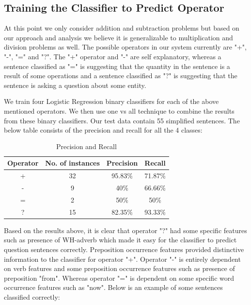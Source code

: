 \documentclass[11pt]{article}
\begin{document}
\subsection{Training the Classifier to Predict Operator}
At this point we only consider addition and subtraction problems but based on our approach and analysis we believe it is generalizable to multiplication and division problems as well. The possible operators in our system currently are "+", "-", "=" and "?". The "+" operator and "-" are self explanatory, whereas a sentence classified as "=" is suggesting that the quantity in the sentence is a result of some operations and a sentence classified as "?" is suggesting that the sentence is asking a question about some entity.

We train four Logistic Regression binary classifiers for each of the above mentioned operators. We then use one vs all technique to combine the results from these binary classifiers. Our test data contain 55 simplified sentences. The below table consists of the precision and recall for all the 4 classes:

\begin{table}[h]
\begin{center}
\begin{tabular}{|c|c|c|c|}
\hline
\bf Operator & \bf No. of instances & \bf Precision & \bf Recall \\
\hline
+ & 32 & 95.83\% & 71.87\% \\
\hline
- & 9 & 40\% & 66.66\% \\
\hline
= & 2 & 50\% & 50\% \\
\hline
? & 15 & 82.35\% & 93.33\% \\
\hline
\end{tabular}
\end{center}
\caption{\label{precision-recall-table} Precision and Recall}
\end{table}

Based on the results above, it is clear that operator "?" had some specific features such as presence of WH-adverb which made it easy for the classifier to predict question sentences correctly. Preposition occurrence features provided distinctive information to the classifier for operator "+". Operator "-" is entirely dependent on verb features and some preposition occurrence features such as presence of preposition "from". Whereas operator "=" is dependent on some specific word occurrence features such as "now". Below is an example of some sentences classified correctly:
\end{document}
